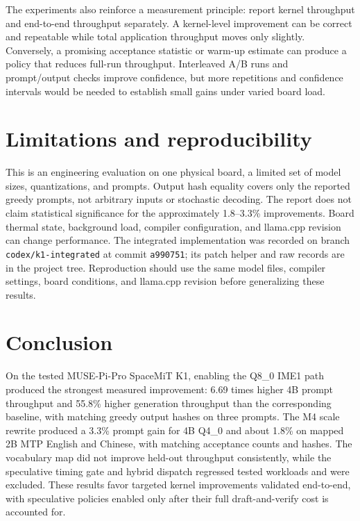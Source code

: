 \documentclass[10pt,twocolumn]{article}
\begin{document}
The experiments also reinforce a measurement principle: report kernel throughput and end-to-end throughput separately. A kernel-level improvement can be correct and repeatable while total application throughput moves only slightly. Conversely, a promising acceptance statistic or warm-up estimate can produce a policy that reduces full-run throughput. Interleaved A/B runs and prompt/output checks improve confidence, but more repetitions and confidence intervals would be needed to establish small gains under varied board load.

\section{Limitations and reproducibility}
This is an engineering evaluation on one physical board, a limited set of model sizes, quantizations, and prompts. Output hash equality covers only the reported greedy prompts, not arbitrary inputs or stochastic decoding. The report does not claim statistical significance for the approximately 1.8--3.3\% improvements. Board thermal state, background load, compiler configuration, and llama.cpp revision can change performance. The integrated implementation was recorded on branch \texttt{codex/k1-integrated} at commit \texttt{a990751}; its patch helper and raw records are in the project tree. Reproduction should use the same model files, compiler settings, board conditions, and llama.cpp revision before generalizing these results.

\section{Conclusion}
On the tested MUSE-Pi-Pro SpaceMiT K1, enabling the Q8\_0 IME1 path produced the strongest measured improvement: 6.69 times higher 4B prompt throughput and 55.8\% higher generation throughput than the corresponding baseline, with matching greedy output hashes on three prompts. The M4 scale rewrite produced a 3.3\% prompt gain for 4B Q4\_0 and about 1.8\% on mapped 2B MTP English and Chinese, with matching acceptance counts and hashes. The vocabulary map did not improve held-out throughput consistently, while the speculative timing gate and hybrid dispatch regressed tested workloads and were excluded. These results favor targeted kernel improvements validated end-to-end, with speculative policies enabled only after their full draft-and-verify cost is accounted for.
\end{document}
